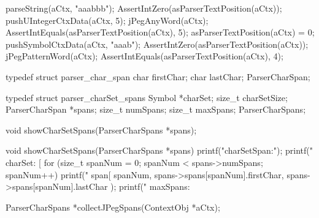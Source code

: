   parseString(aCtx, "aaabbb");
  AssertIntZero(asParserTextPosition(aCtx));
  pushUIntegerCtxData(aCtx, 5);
  jPegAnyWord(aCtx);
  AssertIntEquals(asParserTextPosition(aCtx), 5);
  asParserTextPosition(aCtx) = 0;
  pushSymbolCtxData(aCtx, "aaab");
  AssertIntZero(asParserTextPosition(aCtx));
  jPegPatternWord(aCtx);
  AssertIntEquals(asParserTextPosition(aCtx), 4);
\stopCTest
\stopTestCase
\stopTestSuite



\startCHeader
typedef struct parser_char_span {
  char firstChar;
  char lastChar;
} ParserCharSpan;

typedef struct parser_charSet_spans {
  Symbol         *charSet;
  size_t          charSetSize;
  ParserCharSpan *spans;
  size_t          numSpans;
  size_t          maxSpans;
} ParserCharSpans;
\stopCHeader

\startCHeader
void showCharSetSpans(ParserCharSpans *spans);
\stopCHeader

\startCCode
void showCharSetSpans(ParserCharSpans *spans){
  printf("charSetSpan:\n");
  printf("  charSet: [%
  for (size_t spanNum = 0; spanNum < spans->numSpans; spanNum++) {
    printf("  span[%
      spanNum,
      spans->spans[spanNum].firstChar,
      spans->spans[spanNum].lastChar
    );
  }
  printf("  maxSpans: %
}
\stopCCode

\startCHeader
ParserCharSpans *collectJPegSpans(ContextObj *aCtx);
\stopCHeader

